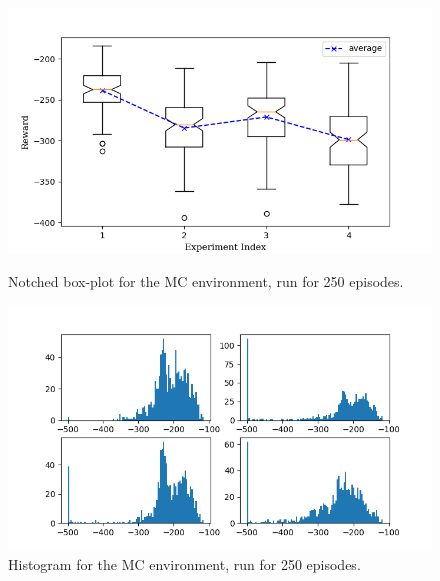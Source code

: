 \documentclass[hidelinks,journal]{IEEEtran}
\begin{document}
\begin{appendices}
\begin{figure}[!h]
  \centering
  \includegraphics[scale=1]{graph/mc2ResBox.png}
  \caption{Notched box-plot for the MC environment, run for 250 episodes.}
  \includegraphics[scale=1]{graph/mc2ResHist.png}
  \caption{Histogram for the MC environment, run for 250 episodes.}
\end{figure}

\pagebreak


\end{appendices}
\end{document}
